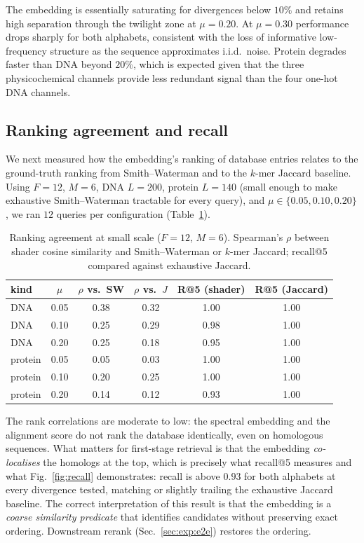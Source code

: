 \documentclass[twocolumn,11pt,a4paper]{article}
\theoremstyle{definition}
\theoremstyle{remark}
\begin{document}
The embedding is essentially saturating for divergences below $10\%$ and
retains high separation through the twilight zone at $\mu = 0.20$. At
$\mu = 0.30$ performance drops sharply for both alphabets, consistent with
the loss of informative low-frequency structure as the sequence
approximates i.i.d.\ noise. Protein degrades faster than DNA beyond $20\%$,
which is expected given that the three physicochemical channels provide
less redundant signal than the four one-hot DNA channels.

\subsection{Ranking agreement and recall}
\label{sec:exp:rank}

We next measured how the embedding's ranking of database entries relates to
the ground-truth ranking from Smith--Waterman and to the $k$-mer Jaccard
baseline. Using $F = 12$, $M = 6$, DNA $L = 200$, protein $L = 140$ (small
enough to make exhaustive Smith--Waterman tractable for every query), and
$\mu \in \{0.05, 0.10, 0.20\}$, we ran $12$ queries per configuration
(Table~\ref{tab:rank}).



\begin{table}[t]
  \centering\small
  \caption{Ranking agreement at small scale ($F=12$, $M=6$). Spearman's
  $\rho$ between shader cosine similarity and Smith--Waterman or
  $k$-mer Jaccard; recall@5 compared against exhaustive Jaccard.}
  \label{tab:rank}
  \begin{tabular}{l c | c c | c c}
    \toprule
    kind & $\mu$ & $\rho$ vs.\ SW & $\rho$ vs.\ $J$ & R@5 (shader) & R@5 (Jaccard) \\
    \midrule
    DNA     & 0.05 & 0.38 & 0.32 & 1.00 & 1.00 \\
    DNA     & 0.10 & 0.25 & 0.29 & 0.98 & 1.00 \\
    DNA     & 0.20 & 0.25 & 0.18 & 0.95 & 1.00 \\
    protein & 0.05 & 0.05 & 0.03 & 1.00 & 1.00 \\
    protein & 0.10 & 0.20 & 0.25 & 1.00 & 1.00 \\
    protein & 0.20 & 0.14 & 0.12 & 0.93 & 1.00 \\
    \bottomrule
  \end{tabular}
\end{table}

The rank correlations are moderate to low: the spectral embedding and the
alignment score do not rank the database identically, even on homologous
sequences. What matters for first-stage retrieval is that the embedding
\emph{co-localises} the homologs at the top, which is precisely what
recall@5 measures and what Fig.~\ref{fig:recall} demonstrates: recall is
above $0.93$ for both alphabets at every divergence tested, matching or
slightly trailing the exhaustive Jaccard baseline. The correct
interpretation of this result is that the embedding is a \emph{coarse
similarity predicate} that identifies candidates without preserving exact
ordering. Downstream rerank (Sec.~\ref{sec:exp:e2e}) restores the ordering.
\end{document}
